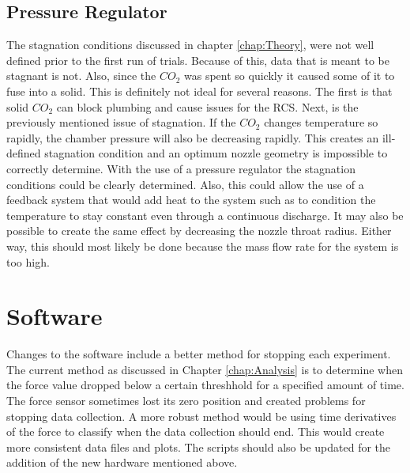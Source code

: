 \subsection{Pressure Regulator}
The stagnation conditions discussed in chapter \ref{chap:Theory}, were not well defined prior to the first run of trials. Because of this, data that is meant to be stagnant is not. Also, since the $CO_2$ was spent so quickly it caused some of it to fuse into a solid. This is definitely not ideal for several reasons. The first is that solid $CO_2$ can block plumbing and cause issues for the RCS. Next, is the previously mentioned issue of stagnation. If the $CO_2$ changes temperature so rapidly, the chamber pressure will also be decreasing rapidly. This creates an ill-defined stagnation condition and an optimum nozzle geometry is impossible to correctly determine. With the use of a pressure regulator the stagnation conditions could be clearly determined. Also, this could allow the use of a feedback system that would add heat to the system such as to condition the temperature to stay constant even through a continuous discharge. It may also be possible to create the same effect by decreasing the nozzle throat radius. Either way, this should most likely be done because the mass flow rate for the system is too high.
\section{Software}
Changes to the software include a better method for stopping each experiment. The current method as discussed in Chapter \ref{chap:Analysis} is to determine when the force value dropped below a certain threshhold for a specified amount of time. The force sensor sometimes lost its zero position and created problems for stopping data collection. A more robust method would be using time derivatives of the force to classify when the data collection should end. This would create more consistent data files and plots. The scripts should also be updated for the addition of the new hardware mentioned above.